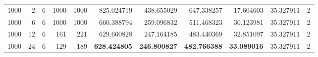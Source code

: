 \begin{table}
\begin{tabular}{rrrrrrrrrrr}
1000 & 2 & 6 & 1000 & 1000 & 825.024719 & 438.655029 & 647.338257 & 17.604603 & 35.327911 & 2 \\
1000 & 6 & 6 & 1000 & 1000 & 660.388794 & 259.096832 & 511.468323 & 30.123981 & 35.327911 & 2 \\
1000 & 12 & 6 & 161 & 221 & 629.660828 & 247.164185 & 483.440369 & 32.851097 & 35.327911 & 2 \\
1000 & 24 & 6 & 129 & 189 & \textbf{628.424805} & \textbf{246.800827} & \textbf{482.766388} & \textbf{33.089016} & 35.327911 & 2 \\
\bottomrule
\end{tabular}
\end{table}


